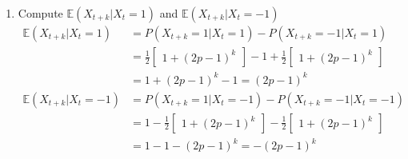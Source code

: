 \documentclass[]{article}
\begin{document}
\begin{enumerate}[label=\alph*)]
	\item Compute $\mathbb{E}(X_{t+k}|X_t=1)$ and $\mathbb{E}(X_{t+k}|X_t=-1)$
	\begin{equation}
	\begin{split}
		\mathbb{E}(X_{t+k}|X_t=1)& = P(X_{t+k}=1|X_t=1) - P(X_{t+k}=-1|X_t=1)\\ \nonumber
		& = \frac{1}{2}\begin{bmatrix}1+(2p-1)^k\end{bmatrix} - 1 + \frac{1}{2}\begin{bmatrix}1+(2p-1)^k\end{bmatrix} \\
		& = 1+(2p-1)^k-1 = (2p-1)^k \\
		\mathbb{E}(X_{t+k}|X_t=-1)& = P(X_{t+k}=1|X_t=-1) - P(X_{t+k}=-1|X_t=-1)\\
		& = 1-\frac{1}{2}\begin{bmatrix}1+(2p-1)^k\end{bmatrix} - \frac{1}{2}\begin{bmatrix}1+(2p-1)^k\end{bmatrix} \\
		& = 1-1-(2p-1)^k = -(2p-1)^k
	\end{split}
	\end{equation}
	

\end{enumerate}
\end{document}

